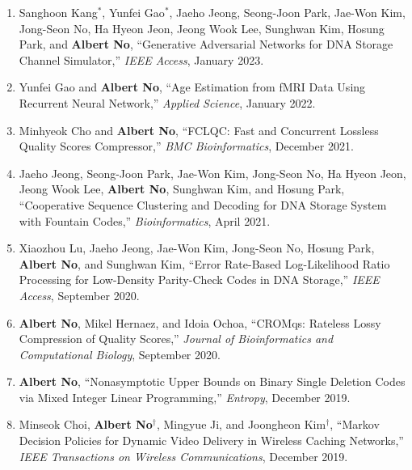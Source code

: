 \documentclass[10pt]{article}
\begin{document}
\begin{enumerate}[(J1)]
\item Sanghoon Kang$^*$, Yunfei Gao$^*$, Jaeho Jeong, Seong-Joon Park, Jae-Won Kim, Jong-Seon No, Ha Hyeon Jeon, Jeong Wook Lee, Sunghwan Kim, Hosung Park, and {{\bf Albert No}},
``Generative Adversarial Networks for DNA Storage Channel Simulator,''
{\it IEEE Access}, January 2023.\\

\item Yunfei Gao and {{\bf Albert No}},
``Age Estimation from fMRI Data Using Recurrent Neural Network,''
{\it Applied Science}, January 2022.\\

\item Minhyeok Cho and {{\bf Albert No}},
``FCLQC: Fast and Concurrent Lossless Quality Scores Compressor,''
{\it BMC Bioinformatics}, December 2021.\\

\item Jaeho Jeong, Seong-Joon Park, Jae-Won Kim, Jong-Seon No, Ha Hyeon Jeon, Jeong Wook Lee, {{\bf Albert No}}, Sunghwan Kim, and Hosung Park,
``Cooperative Sequence Clustering and Decoding for DNA Storage System with Fountain Codes,''
{\it Bioinformatics}, April 2021.\\

\item Xiaozhou Lu, Jaeho Jeong, Jae-Won Kim, Jong-Seon No, Hosung Park, {{\bf Albert No}}, and Sunghwan Kim,
``Error Rate-Based Log-Likelihood Ratio Processing for Low-Density Parity-Check Codes in DNA Storage,''
{\it IEEE Access}, September 2020.\\

\item {{\bf Albert No}}, Mikel Hernaez, and Idoia Ochoa,
``CROMqs: Rateless Lossy Compression of Quality Scores,''
{\it Journal of Bioinformatics and Computational Biology}, September 2020.\\

\item {{\bf Albert No}},
``Nonasymptotic Upper Bounds on Binary Single Deletion Codes via Mixed Integer Linear Programming,''
{\it Entropy}, December 2019.\\

\item Minseok Choi, {{\bf Albert No}}$^\dagger$, Mingyue Ji, and Joongheon Kim$^\dagger$,
``Markov Decision Policies for Dynamic Video Delivery in Wireless Caching Networks,''
{\it IEEE Transactions on Wireless Communications}, December 2019.\\


\end{enumerate}
\end{document}
